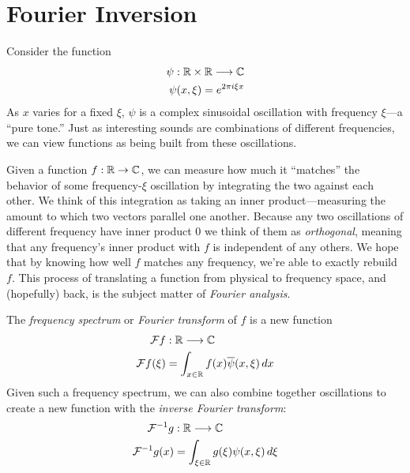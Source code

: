 
  \chapter{Fourier Inversion}

    Consider the function
    \begin{align*}
      \psi:\mathbb{R}\times\mathbb{R}\longrightarrow\mathbb{C}\\
      \psi(x,\xi) = e^{2\pi i \xi x}
    \end{align*}
    As $x$ varies for a fixed $\xi$, $\psi$ is a complex sinusoidal oscillation with frequency $\xi$\footnotemark---a ``pure tone.''
    Just as interesting sounds are combinations of different frequencies, we can view functions as being built from these oscillations. 

    Given a function $f:\mathbb{R}\rightarrow\mathbb{C}$, we can measure how much it ``matches'' the behavior of some frequency-$\xi$ oscillation by integrating the two against each other.
    We think of this integration as taking an inner product---measuring the amount to which two vectors parallel one another.
    Because any two oscillations of different frequency have inner product 0 we think of them as \emph{orthogonal}, meaning that any frequency's inner product with $f$ is independent of any others.
    We hope that by knowing how well $f$ matches any frequency, we're able to exactly rebuild $f$.
    This process of translating a function from physical to frequency space, and (hopefully) back, is the subject matter of \emph{Fourier analysis}.

    \begin{nbdefn}
      The \emph{frequency spectrum} or \emph{Fourier transform} of $f$ is a new function 
      \begin{align*}
        \mathcal{F} f&:\mathbb{R}\longrightarrow\mathbb{C}\\
        \mathcal{F} f(\xi) &= \int_{x\in\mathbb{R}} f(x)\overline\psi(x,\xi)\,dx
      \end{align*}
      Given such a frequency spectrum, we can also combine together oscillations to create a new function with the \emph{inverse Fourier transform}:
      \begin{align*}
        \mathcal{F}^{-1}g&:\mathbb{R}\longrightarrow\mathbb{C}\\
        \mathcal{F}^{-1}g(x) &= \int_{\xi\in\mathbb{R}} g(\xi)\psi(x,\xi)\,d\xi
      \end{align*}
      \vspace{-15pt}
    \end{nbdefn}

